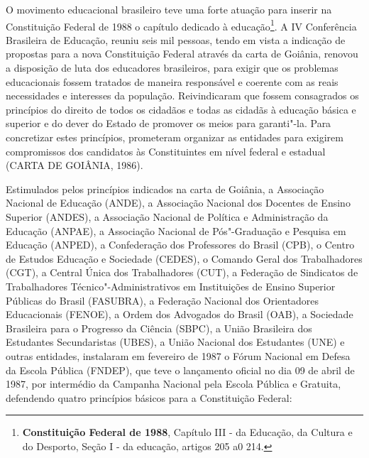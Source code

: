 O movimento educacional brasileiro teve uma forte atuação para inserir
na Constituição Federal de 1988 o capítulo dedicado à educação\footnote{\textbf{Constituição
  Federal de 1988}, Capítulo III - da Educação, da Cultura e do
  Desporto, Seção I
  - da educação, artigos 205 a0 214.}. A IV Conferência Brasileira de
Educação, reuniu seis mil pessoas, tendo em vista a indicação de
propostas para a nova Constituição Federal através da carta de Goiânia,
renovou a disposição de luta dos educadores brasileiros, para exigir que
os problemas educacionais fossem tratados de maneira responsável e
coerente com as reais necessidades e interesses da população.
Reivindicaram que fossem consagrados os princípios do direito de todos
os cidadãos e todas as cidadãs à educação básica e superior e do dever
do Estado de promover os meios para garanti"-la. Para concretizar estes
princípios, prometeram organizar as entidades para exigirem compromissos
dos candidatos às Constituintes em nível federal e estadual (CARTA DE
GOIÂNIA, 1986).

Estimulados pelos princípios indicados na carta de Goiânia, a Associação
Nacional de Educação (ANDE), a Associação Nacional dos Docentes de
Ensino Superior (ANDES), a Associação Nacional de Política e
Administração da Educação (ANPAE), a Associação Nacional de
Pós"-Graduação e Pesquisa em Educação (ANPED), a Confederação dos
Professores do Brasil (CPB), o Centro de Estudos Educação e Sociedade
(CEDES), o Comando Geral dos Trabalhadores (CGT), a Central Única dos
Trabalhadores (CUT), a Federação de Sindicatos de Trabalhadores
Técnico"-Administrativos em Instituições de Ensino Superior Públicas do
Brasil (FASUBRA), a Federação Nacional dos Orientadores Educacionais
(FENOE), a Ordem dos Advogados do Brasil (OAB), a Sociedade Brasileira
para o Progresso da Ciência (SBPC), a União Brasileira dos Estudantes
Secundaristas (UBES), a União Nacional dos Estudantes (UNE) e outras
entidades, instalaram em fevereiro de 1987 o Fórum Nacional em Defesa da
Escola Pública (FNDEP), que teve o lançamento oficial no dia 09 de abril
de 1987, por intermédio da Campanha Nacional pela Escola Pública e
Gratuita, defendendo quatro princípios básicos para a Constituição
Federal:

